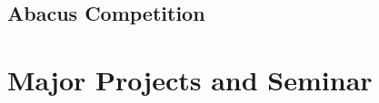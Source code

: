 \documentclass{article}
\begin{document}
	\subsection{Abacus Competition}
		\begin{figure}[h]
		\end{figure}
\newpage
\section{Major Projects and Seminar}
\end{document}
